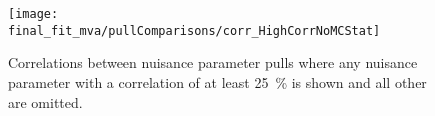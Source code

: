 \begin{landscape}
  \begin{figure}[hb]
	\centering
	\texttt{[image: final\_fit\_mva/pullComparisons/corr\_HighCorrNoMCStat]}
  \caption[Correlations between nuisance parameter pulls.]{Correlations between
    nuisance parameter pulls where any nuisance parameter with a correlation of
    at least 25~\% is shown and all other are omitted.}
  \label{fig:np-corrs}
\end{figure}
\end{landscape}